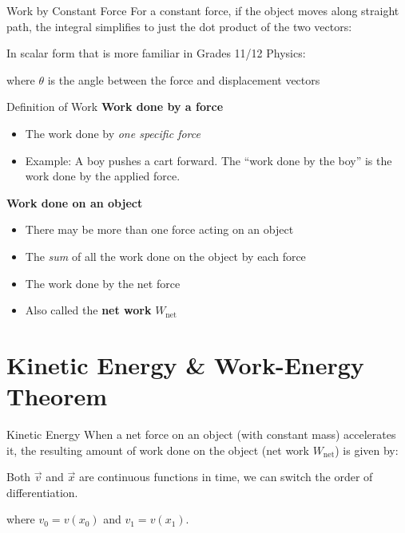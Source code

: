 \documentclass[12pt,compress,aspectratio=169]{beamer}
\begin{document}
\begin{frame}{Work by Constant Force}
  For a constant force, if the object moves along straight path, the integral
  simplifies to just the dot product of the two vectors:


  In scalar form that is more familiar in Grades 11/12 Physics:


  \vspace{-.13in}where $\theta$ is the angle between the force and displacement
  vectors
\end{frame}



\begin{frame}{Definition of Work}
  \textbf{Work done by a force}
  \begin{itemize}
  \item The work done by \emph{one specific force}
  \item Example: A boy pushes a cart forward. The ``work done by the boy'' is
    the work done by the applied force.
  \end{itemize}

  \vspace{.15in}\textbf{Work done on an object}
  \begin{itemize}
  \item There may be more than one force acting on an object
  \item The \emph{sum} of all the work done on the object by each force
  \item The work done by the net force
  \item Also called the \textbf{net work} $W_\text{net}$
  \end{itemize}
\end{frame}



\section{Kinetic Energy \& Work-Energy Theorem}

\begin{frame}{Kinetic Energy}
  When a net force on an object (with constant mass) accelerates it, the
  resulting amount of work done on the object (net work $W_\text{net}$) is
  given by:


  Both $\vec v$ and $\vec x$ are continuous functions in time, we can switch
  the order of differentiation.
  

  where $v_0=v(x_0)$ and $v_1=v(x_1)$.
\end{frame}
\end{document}
